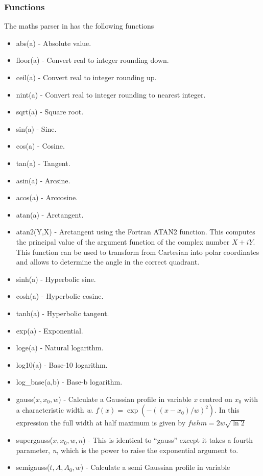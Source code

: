 \subsubsection{Functions}
\label{sec:functions}
The maths parser in {\EPOCH} has the following functions
\begin{itemize}
\item abs(a) - Absolute value.
\item floor(a) - Convert real to integer rounding down.
\item ceil(a) - Convert real to integer rounding up.
\item nint(a) - Convert real to integer rounding to nearest integer.
\item sqrt(a) - Square root.
\item sin(a) - Sine.
\item cos(a) - Cosine.
\item tan(a) - Tangent.
\item asin(a) - Arcsine.
\item acos(a) - Arccosine.
\item atan(a) - Arctangent.
\item atan2(Y,X) - Arctangent using the Fortran ATAN2 function. This computes
    the principal value of the argument function of the complex number
    $X + i Y$. This function can be used to transform from Cartesian into polar
    coordinates and allows to determine the angle in the correct quadrant.
\item sinh(a) - Hyperbolic sine.
\item cosh(a) - Hyperbolic cosine.
\item tanh(a) - Hyperbolic tangent.
\item exp(a) - Exponential.
\item loge(a) - Natural logarithm.
\item log10(a) - Base-10 logarithm.
\item log\_base(a,b) - Base-b logarithm.
\item gauss($x,x_0,w$) - Calculate a Gaussian profile in variable
    {\it x} centred on {\it $x_0$} with a characteristic width {\it w}.
    $f(x) = \exp{(-((x-x_0)/w)^2)}$. In this expression the
    full width at half maximum is given by $fwhm = 2 w \sqrt{\ln{2}}$
\item supergauss($x,x_0,w,n$) - This is identical to ``gauss'' except it
    takes a fourth parameter, {\it n}, which is the power to raise the
    exponential argument to.
\item semigauss($t,A,A_0,w$) - Calculate a semi Gaussian profile in variable

\end{itemize}
